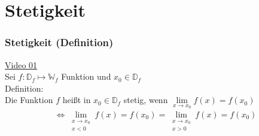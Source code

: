 \chapter{Stetigkeit}

\setcounter{section}{6}
\setcounter{subsection}{0}
\setcounter{subsubsection}{1}
\setcounter{secnumdepth}{3}
\subsection{Stetigkeit (Definition)}
\href{https://youtu.be/w5zo40vnyRQ}{Video 01}\\
Sei $ f:\mathbb{D}_f\longmapsto \mathbb{W}_f $ Funktion und $ x_0\in \mathbb{D}_f $\\
Definition:\\
Die Funktion $ f $ heißt in $ x_0\in\mathbb{D}_f $ stetig, wenn $ \lim\limits_ {x\to x_0}f(x)=f(x_0) $\\
\begin{align*}
\Leftrightarrow \lim\limits_ {\substack{x\to x_0\\x<0}}f(x)=f(x_0)=\lim\limits_ {\substack{x\to x_0\\x>0}}f(x)=f(x_0)
\end{align*}
